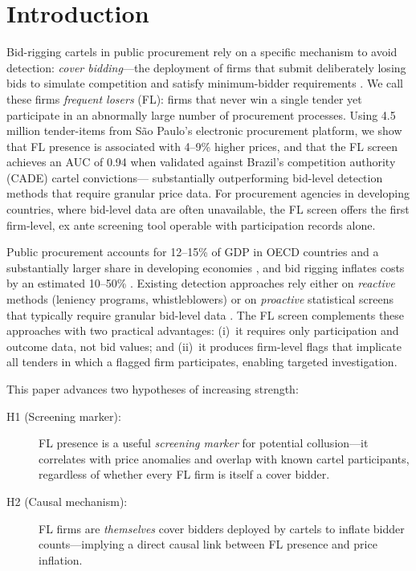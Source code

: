 \section{Introduction}
\label{sec:intro}

Bid-rigging cartels in public procurement rely on a specific mechanism to
avoid detection: \emph{cover bidding}---the deployment of firms that
submit deliberately losing bids to simulate competition and satisfy
minimum-bidder requirements \citep{marshall2012economics}. We call these
firms \emph{frequent losers} (FL): firms that never win a single tender
yet participate in an abnormally large number of procurement processes.
Using 4.5 million tender-items from S\~ao Paulo's electronic procurement
platform, we show that FL presence is associated with 4--9\% higher
prices, and that the FL screen achieves an AUC of 0.94 when validated
against Brazil's competition authority (CADE) cartel convictions---
substantially outperforming bid-level detection methods that require
granular price data. For procurement agencies in developing countries,
where bid-level data are often unavailable, the FL screen offers the
first firm-level, ex ante screening tool operable with participation
records alone.

Public procurement accounts for 12--15\% of GDP in OECD countries and a
substantially larger share in developing economies
\citep{oecd2019government}, and bid rigging inflates costs by an
estimated 10--50\% \citep{connor2007price}. Existing detection
approaches rely either on \emph{reactive} methods (leniency programs,
whistleblowers) or on \emph{proactive} statistical screens that
typically require granular bid-level data \citep{harrington2008detecting,
imhof2019detecting}. The FL screen complements these approaches with two
practical advantages: (i)~it requires only participation and outcome
data, not bid values; and (ii)~it produces firm-level flags that
implicate all tenders in which a flagged firm participates, enabling
targeted investigation.

This paper advances two hypotheses of increasing strength:

\begin{description}
  \item[H1 (Screening marker):] FL presence is a useful
    \emph{screening marker} for potential collusion---it correlates
    with price anomalies and overlap with known cartel participants,
    regardless of whether every FL firm is itself a cover bidder.
  \item[H2 (Causal mechanism):] FL firms are \emph{themselves} cover
    bidders deployed by cartels to inflate bidder counts---implying a
    direct causal link between FL presence and price inflation.
\end{description}


